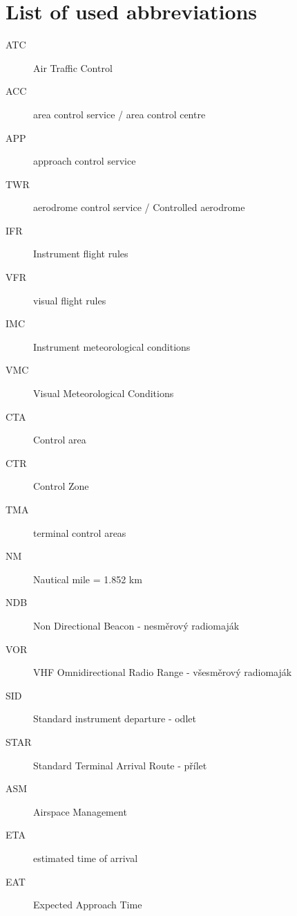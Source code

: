 \chapter{List of used abbreviations}

\begin{description}
\item[ATC] Air Traffic Control
\item[ACC] area control service / area control centre
\item[APP] approach control service
\item[TWR] aerodrome control service / Controlled aerodrome
\item[IFR] Instrument flight rules
\item[VFR] visual flight rules
\item[IMC] Instrument meteorological conditions
\item[VMC] Visual Meteorological Conditions
\item[CTA] Control area
\item[CTR] Control Zone
\item[TMA] terminal control areas
\item[NM] Nautical mile = 1.852 km
\item[NDB] Non Directional Beacon - nesměrový radiomaják
\item[VOR] VHF Omnidirectional Radio Range - všesměrový radiomaják
\item[SID] Standard instrument departure - odlet
\item[STAR] Standard Terminal Arrival Route - přílet
\item[ASM] Airspace Management
\item[ETA] estimated time of arrival
\item[EAT] Expected Approach Time
\end{description}